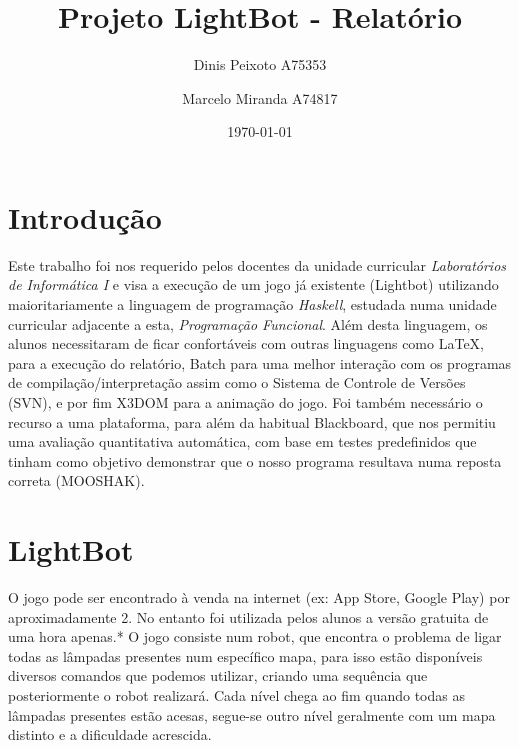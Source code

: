 \documentclass[a4paper,12pt]{report}
\title{Projeto LightBot - Relatório}
\author{Dinis Peixoto A75353 \and Marcelo Miranda A74817}
\date{\today}
\begin{document}
 


\maketitle


\tableofcontents


\chapter{Introdução}
Este trabalho foi nos requerido pelos docentes da unidade curricular \emph{Laboratórios de Informática I} e visa a execução de um jogo já existente (Lightbot) utilizando maioritariamente a linguagem de programação \emph{Haskell}, estudada numa unidade curricular adjacente a esta, \emph{Programação Funcional}. Além desta linguagem, os alunos necessitaram de ficar confortáveis com outras linguagens como \LaTeX, para a execução do relatório, Batch para uma melhor interação com os programas de compilação/interpretação assim como o Sistema de Controle de Versões (SVN), e por fim \textsc{X3DOM} para a animação do jogo. 
Foi também necessário o recurso a uma plataforma, para além da habitual Blackboard, que nos permitiu uma avaliação quantitativa automática, com base em testes predefinidos que tinham como objetivo demonstrar que o nosso programa resultava numa reposta correta (\textsc{MOOSHAK}).

\chapter{LightBot}
O jogo pode ser encontrado à venda na internet (ex: App Store, Google Play) por aproximadamente 2\texteuro. No entanto foi utilizada pelos alunos a versão gratuita de uma hora apenas.*
O jogo consiste num robot, que encontra o problema de ligar todas as lâmpadas presentes num específico mapa, para isso estão disponíveis diversos comandos que podemos utilizar, criando uma sequência que posteriormente o robot realizará. Cada nível chega ao fim quando todas as lâmpadas presentes estão acesas, segue-se outro nível geralmente com um mapa distinto e a dificuldade acrescida.
\end{document}
